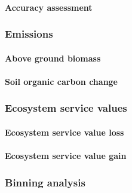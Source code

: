 		\paragraph{Accuracy assessment}

	\subsubsection{Emissions}
		\paragraph{Above ground biomass}
		\paragraph{Soil organic carbon change}

	\subsubsection{Ecosystem service values}
		\paragraph{Ecosystem service value loss}
		\paragraph{Ecosystem service value gain}

	\subsubsection{Binning analysis}